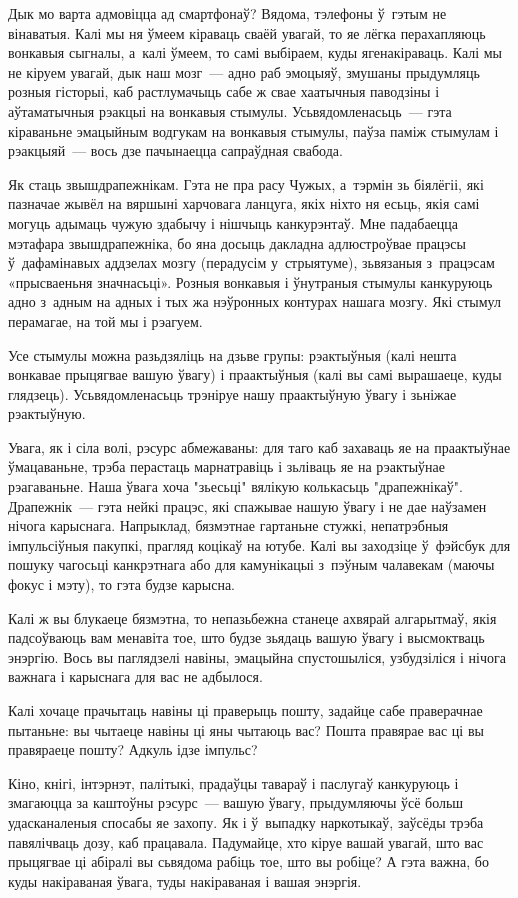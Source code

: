 Дык мо варта адмовіцца ад смартфонаў? Вядома, тэлефоны ў~гэтым не вінаватыя. Калі мы ня ўмеем кіраваць сваёй увагай, то яе лёгка перахапляюць вонкавыя сыгналы, а~калі ўмеем, то самі выбіраем, куды ягенакіраваць. Калі мы не кіруем увагай, дык наш мозг~--- адно раб эмоцыяў, змушаны прыдумляць розныя гісторыі, каб растлумачыць сабе ж свае хаатычныя паводзіны і аўтаматычныя рэакцыі на вонкавыя стымулы. Усьвядомленасьць~--- гэта кіраваньне эмацыйным водгукам на вонкавыя стымулы, паўза паміж стымулам і рэакцыяй~--- вось дзе пачынаецца сапраўдная свабода.

Як стаць звышдрапежнікам. Гэта не пра расу Чужых, а~тэрмін зь біялёгіі, які пазначае жывёл на вяршыні харчовага ланцуга, якіх ніхто ня есьць, якія самі могуць адымаць чужую здабычу і нішчыць канкурэнтаў. Мне падабаецца мэтафара звышдрапежніка, бо яна досыць дакладна адлюстроўвае працэсы ў~дафамінавых аддзелах мозгу (перадусім у~стрыятуме), зьвязаныя з~працэсам «прысваеньня значнасьці». Розныя вонкавыя і ўнутраныя стымулы канкуруюць адно з~адным на адных і тых жа нэўронных контурах нашага мозгу. Які стымул перамагае, на той мы і рэагуем.

Усе стымулы можна разьдзяліць на дзьве групы: рэактыўныя (калі нешта вонкавае прыцягвае вашую ўвагу) і праактыўныя (калі вы самі вырашаеце, куды глядзець). Усьвядомленасьць трэніруе нашу праактыўную ўвагу і зьніжае рэактыўную.

Увага, як і сіла волі, рэсурс абмежаваны: для таго каб захаваць яе на праактыўнае ўмацаваньне, трэба перастаць марнатравіць і зьліваць яе на рэактыўнае рэагаваньне. Наша ўвага хоча "зьесьці" вялікую колькасьць "драпежнікаў". Драпежнік~--- гэта нейкі працэс, які спажывае нашую ўвагу і не дае наўзамен нічога карыснага. Напрыклад, бязмэтнае гартаньне стужкі, непатрэбныя імпульсіўныя пакупкі, прагляд коцікаў на ютубе. Калі вы заходзіце ў~фэйсбук для пошуку чагосьці канкрэтнага або для камунікацыі з~пэўным чалавекам (маючы фокус і мэту), то гэта будзе карысна.

Калі ж вы блукаеце бязмэтна, то непазьбежна станеце ахвярай алгарытмаў, якія падсоўваюць вам менавіта тое, што будзе зьядаць вашую ўвагу і высмоктваць энэргію. Вось вы паглядзелі навіны, эмацыйна спустошыліся, узбудзіліся і нічога важнага і карыснага для вас не адбылося. 

Калі хочаце прачытаць навіны ці праверыць пошту, задайце сабе праверачнае пытаньне: вы чытаеце навіны ці яны чытаюць вас? Пошта правярае вас ці вы правяраеце пошту? Адкуль ідзе імпульс?

Кіно, кнігі, інтэрнэт, палітыкі, прадаўцы тавараў і паслугаў канкуруюць і змагаюцца за каштоўны рэсурс~--- вашую ўвагу, прыдумляючы ўсё больш удасканаленыя спосабы яе захопу. Як і ў~выпадку наркотыкаў, заўсёды трэба павялічваць дозу, каб працавала. Падумайце, хто кіруе вашай увагай, што вас прыцягвае ці абіралі вы сьвядома рабіць тое, што вы робіце? А гэта важна, бо куды накіраваная ўвага, туды накіраваная і вашая энэргія.

